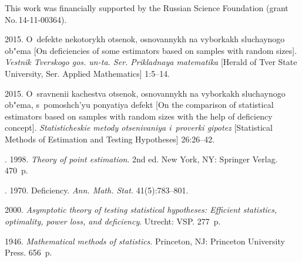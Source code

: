 

\Ack
\noindent
This work was financially supported by the Russian Science Foundation 
(grant No.\,14-11-00364).



  \begin{multicols}{2}

\renewcommand{\bibname}{\protect\rmfamily References}

{\small\frenchspacing
 {%
 \begin{thebibliography}{9}
 
 2015. O~defekte nekotorykh otsenok, osnovannykh na
vyborkakh sluchaynogo ob"ema [On deficiencies of some estimators based  
on samples with random sizes].
\textit{Vestnik Tverskogo gos. un-ta. Ser. 
Prikladnaya matematika} [Herald of Tver State University, Ser. Applied Mathematics] 
1:5--14.

2015. O~sravnenii kachestva otsenok, osnovannykh na vyborkakh sluchaynogo ob"ema, 
s~pomoshch'yu ponyatiya defekt [On the comparison of statistical estimators
based on samples with random sizes with the help of deficiency concept]. 
\textit{Statisticheskie metody otsenivaniya i~proverki gipotez} [Statistical Methods
of Estimation and Testing Hypotheses] 26:26--42.

. 1998. 
\textit{Theory of point estimation}. 2nd ed. New York, NY: Springer Verlag. 470~p.

. 1970. 
Deficiency. \textit{Ann. Math. Stat.} 41(5):783--801.

 2000. \textit{Asymptotic theory of testing statistical hypotheses: 
Efficient statistics,
optimality, power loss, and deficiency}. Utrecht: VSP. 277~p.

 1946. 
\textit{Mathematical methods of statistics}. Princeton, NJ: Princeton University Press.
656~p.





\end{thebibliography}

 }
 }

\end{multicols}

